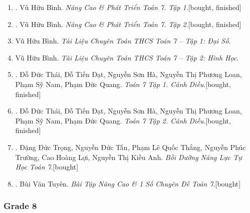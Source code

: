 \documentclass{article}
\begin{document}
\begin{enumerate}
	\item \cite{Binh_Toan_7_tap_1}. Vũ Hữu Bình. \textit{Nâng Cao \& Phát Triển Toán 7. Tập 1}.\hfill\textsf{[bought, finished]}
	\item \cite{Binh_Toan_7_tap_2}. Vũ Hữu Bình. \textit{Nâng Cao \& Phát Triển Toán 7. Tập 2}.\hfill\textsf{[bought, finished]}
	\item Vũ Hữu Bình. \textit{Tài Liệu Chuyên Toán THCS Toán 7 -- Tập 1: Đại Số}.
	\item Vũ Hữu Bình. \textit{Tài Liệu Chuyên Toán THCS Toán 7 -- Tập 2: Hình Học}.
	\item \cite{SGK_Toan_7_Canh_Dieu_tap_1}. Đỗ Đức Thái, Đỗ Tiến Đạt, Nguyễn Sơn Hà, Nguyễn Thị Phương Loan, Phạm Sỹ Nam, Phạm Đức Quang. \textit{Toán 7 Tập 1. Cánh Diều}.\hfill\textsf{[bought, finished]}
	\item \cite{SGK_Toan_7_Canh_Dieu_tap_2}. Đỗ Đức Thái, Đỗ Tiến Đạt, Nguyễn Sơn Hà, Nguyễn Thị Phương Loan, Phạm Sỹ Nam, Phạm Đức Quang. \textit{Toán 7 Tập 2. Cánh Diều}.\hfill\textsf{[bought, finished]}
	\item \cite{Trong_Toan_7_2022}. Đặng Đức Trọng, Nguyễn Đức Tấn, Phạm Lê Quốc Thắng, Nguyễn Phúc Trường, Cao Hoàng Lợi, Nguyễn Thị Kiều Anh. \textit{Bồi Dưỡng Năng Lực Tự Học Toán 7}.\hfill\textsf{[bought]}
	\item \cite{Tuyen_Toan_7}. Bùi Văn Tuyên. \textit{Bài Tập Nâng Cao \& 1 Số Chuyên Đề Toán 7}.\hfill\textsf{[bought]}
\end{enumerate}

\subsubsection{Grade 8}
\end{document}

